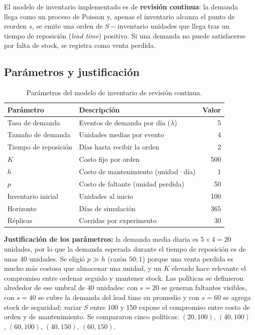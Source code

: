 \documentclass[11pt,a4paper]{article}
\begin{document}
El modelo de inventario implementado es de \textbf{revisión continua}: la
demanda llega como un proceso de Poisson y, apenas el inventario alcanza el
punto de reorden $s$, se emite una orden de $S - \text{inventario}$ unidades
que llega tras un tiempo de reposición (\emph{lead time}) positivo. Si una
demanda no puede satisfacerse por falta de stock, se registra como venta
perdida.

\subsection{Parámetros y justificación}

\begin{table}[H]
\centering
\begin{tabular}{llr}
\toprule
Parámetro & Descripción & Valor \\
\midrule
Tasa de demanda & Eventos de demanda por día ($\lambda$) & 5 \\
Tamaño de demanda & Unidades medias por evento & 4 \\
Tiempo de reposición & Días hasta recibir la orden & 2 \\
$K$ & Costo fijo por orden & 500 \\
$h$ & Costo de mantenimiento (unidad·día) & 1 \\
$p$ & Costo de faltante (unidad perdida) & 50 \\
Inventario inicial & Unidades al inicio & 100 \\
Horizonte & Días de simulación & 365 \\
Réplicas & Corridas por experimento & 30 \\
\bottomrule
\end{tabular}
\caption{Parámetros del modelo de inventario de revisión continua.}
\end{table}

\textbf{Justificación de los parámetros:} la demanda media diaria es
$5 \times 4 = 20$ unidades, por lo que la demanda esperada durante el tiempo
de reposición es de unas 40 unidades. Se eligió $p \gg h$ (razón $50{:}1$)
porque una venta perdida es mucho más costosa que almacenar una unidad, y un
$K$ elevado hace relevante el compromiso entre ordenar seguido y mantener
stock. Las políticas se definieron alrededor de ese umbral de 40 unidades:
con $s=20$ se generan faltantes visibles, con $s=40$ se cubre la demanda del
lead time en promedio y con $s=60$ se agrega stock de seguridad; variar $S$
entre 100 y 150 expone el compromiso entre costo de orden y de
mantenimiento. Se compararon cinco políticas: $(20,100)$, $(40,100)$,
$(60,100)$, $(40,150)$, $(60,150)$.
\end{document}
